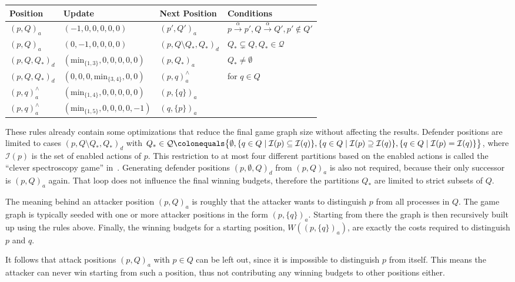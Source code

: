 \begin{table}[h!]
\centering

\begin{tabular}{@{}l@{\hskip 8pt}l@{\hskip 5pt}l l@{}}
    \toprule
    Position &Update &Next Position &Conditions \\
    \midrule
    ${(p, Q)}_a$ &$(-1, 0, 0, 0, 0, 0)$ &${(p', Q')}_a$
        &$p \xrightarrow{\alpha} p', Q \xrightarrow{\alpha} Q', p' \notin Q'$ \\
    ${(p, Q)}_a$ &$(0, -1, 0, 0, 0, 0)$ &${(p, Q \setminus Q_*, Q_*)}_d$
        &$Q_* \subsetneq Q, Q_* \in \mathcal{Q}$ \\
    ${(p, Q, Q_*)}_d$ &$(\mathrm{min}_{\{1, 3\}}, 0, 0, 0, 0, 0)$ &${(p, Q_*)}_a$
        &$Q_* \neq \emptyset$ \\
    ${(p, Q, Q_*)}_d$ &$(0, 0, 0, \mathrm{min}_{\{3, 4\}}, 0, 0)$
        &${(p, q)}_a^{\scriptscriptstyle\land}$
        &for $q \in Q$ \\
    ${(p, q)}_a^{\scriptscriptstyle\land}$
        &$(\mathrm{min}_{\{1, 4\}}, 0, 0, 0, 0, 0)$
        &${(p, \{q\})}_a$ \\
    ${(p, q)}_a^{\scriptscriptstyle\land}$
        &$(\mathrm{min}_{\{1, 5\}}, 0, 0, 0, 0, -1)$
        &${(q, \{p\})}_a$ \\
    \bottomrule
\end{tabular}
\end{table}

These rules already contain some optimizations that reduce the final game graph
size without affecting the results.
Defender positions are limited to cases
${(p, Q \setminus Q_*, Q_*)}_d$ with
$Q_* \in \mathcal{Q} \colonequals
\big\{\emptyset,
    \{q \in Q \mid \mathcal{I}(p) \subseteq \mathcal{I}(q)\},
    \{q \in Q \mid {\mathcal{I}(p) \supseteq \mathcal{I}(q)}\},
    \{q \in Q \mid \mathcal{I}(p) =         \mathcal{I}(q)\}
\big\}$,
where $\mathcal{I}(p)$ is the set of enabled actions of $p$.
This restriction to at most four different partitions
based on the enabled actions is called the
\enquote{clever spectroscopy game} in~\cite{bisping2023process}.
Generating defender positions ${(p, \emptyset, Q)}_d$ from ${(p, Q)}_a$
is also not required,
because their only successor is ${(p, Q)}_a$ again.
That loop does not influence the final winning budgets,
therefore the partitions $Q_*$ are limited to strict subsets of $Q$.

The meaning behind an attacker position ${(p, Q)}_a$ is roughly
that the attacker wants to distinguish $p$ from all processes in $Q$.
The game graph is typically seeded with one or more attacker positions
in the form ${(p, \{q\})}_a$.
Starting from there the graph is then recursively built up
using the rules above.
Finally, the winning budgets for a starting position,
$W({(p, \{q\})}_a)$,
are exactly the costs required to distinguish $p$ and $q$.

It follows that attack positions ${(p, Q)}_a$ with $p \in Q$ can be left out,
since it is impossible to distinguish $p$ from itself.
This means the attacker can never win starting from such a position,
thus not contributing any winning budgets to other positions either.
